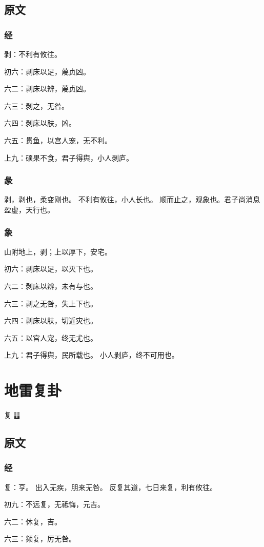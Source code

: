 \documentclass[12pt,oneside]{book}
\begin{document}
\section{原文}
\subsection{经}
剥：不利有攸往。

初六：剥床以足，蔑贞凶。

六二：剥床以辨，蔑贞凶。

六三：剥之，无咎。

六四：剥床以肤，凶。

六五：贯鱼，以宫人宠，无不利。

上九：硕果不食，君子得舆，小人剥庐。

\subsection{彖}
剥，剥也，柔变刚也。 不利有攸往，小人长也。 顺而止之，观象也。君子尚消息盈虚，天行也。
\subsection{象}
山附地上，剥；上以厚下，安宅。

初六：剥床以足，以灭下也。

六二：剥床以辨，未有与也。

六三：剥之无咎，失上下也。

六四：剥床以肤，切近灾也。

六五：以宫人宠，终无尤也。

上九：君子得舆，民所载也。 小人剥庐，终不可用也。

\chapter{地雷复卦}
复 {\Large ䷗}

\section{原文}
\subsection{经}
复：亨。 出入无疾，朋来无咎。 反复其道，七日来复，利有攸往。

初九：不远复，无祗悔，元吉。

六二：休复，吉。

六三：频复，厉无咎。
\end{document}
